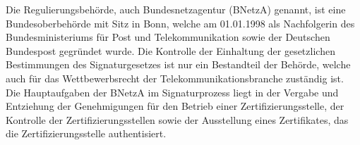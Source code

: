 Die Regulierungsbehörde, auch Bundesnetzagentur (BNetzA) genannt, ist eine Bundesoberbehörde mit Sitz in Bonn, welche am 01.01.1998 als Nachfolgerin des Bundesministeriums für Post und Telekommunikation sowie der Deutschen Bundespost gegründet wurde. Die Kontrolle der Einhaltung der gesetzlichen Bestimmungen des Signaturgesetzes ist nur ein Bestandteil der Behörde, welche auch für das Wettbewerbsrecht der Telekommunikationsbranche zuständig ist. Die Hauptaufgaben der BNetzA im Signaturprozess liegt in der Vergabe und Entziehung der Genehmigungen für den Betrieb einer Zertifizierungsstelle, der Kontrolle der Zertifizierungsstellen sowie der Ausstellung eines Zertifikates, das die Zertifizierungsstelle authentisiert. \cite{standdeswissens3}\cite{regBeh1}